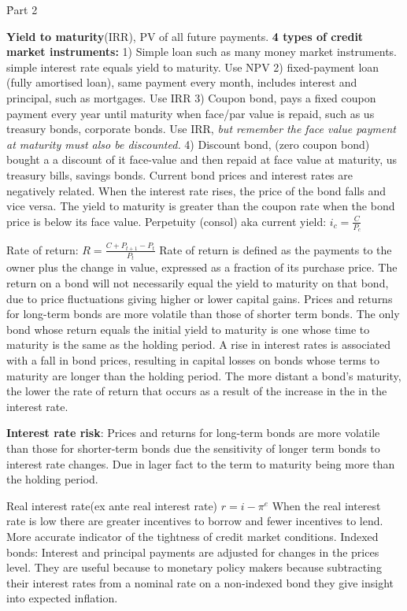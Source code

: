 \documentclass[12pt]{examnotes}
\begin{document}
\h{Part 2}


\textbf{Yield to maturity}(IRR), PV of all future payments. 
\textbf{4 types of credit market instruments:} 
1) Simple loan such as many money market instruments. simple interest rate equals yield to maturity. Use NPV  
2) fixed-payment loan (fully amortised loan), same payment every month, includes interest and principal, such as mortgages. Use IRR 
3) Coupon bond, pays a fixed coupon payment every year until maturity when face/par value is repaid, such as us treasury bonds, corporate bonds. Use IRR, \emph{but remember the face value payment at maturity must also be discounted.}
4) Discount bond, (zero coupon bond) bought a a discount of it face-value and then repaid at face value at maturity, us treasury bills, savings bonds. 
Current bond prices and interest rates are negatively related. When the interest rate rises, the price of the bond falls and vice versa. The yield to  maturity is greater than the coupon rate when the bond price is below its face value. 
Perpetuity (consol) aka current yield: $i_c=\displaystyle\frac{C}{P_c}$ 

Rate of return: $R=\displaystyle \frac{C+P_{t+1}-P_t}{P_t}$
Rate of return is defined as the payments to the owner plus the change in value, expressed as a fraction of its purchase price.
The return on a bond will not necessarily equal the yield to maturity on that bond, due to price fluctuations giving higher or lower capital gains. Prices and returns for long-term bonds are more volatile than those of shorter term bonds. 
The only bond whose return equals the initial yield to maturity is one whose time to maturity is the same as the holding period.
A rise in interest rates is associated with a fall in bond prices, resulting in capital losses on bonds whose terms to maturity are longer than the holding period.
The more distant a bond's maturity, the lower the rate of return that occurs as a result of the increase in the in the interest rate. 

\textbf{Interest rate risk}: Prices and returns for long-term bonds are more volatile than those for shorter-term bonds due the sensitivity of longer term bonds to interest rate changes. Due in lager fact to the term to maturity being more than the holding period.

Real interest rate(ex ante real interest rate) $r=i-\pi^e$ 
When the real interest rate is low there are greater incentives to borrow and fewer incentives to lend. 
More accurate indicator of the tightness of credit market conditions. 
Indexed bonds: Interest and principal payments are adjusted for changes in the prices level. They are useful because to monetary policy makers because subtracting their interest rates from a nominal rate on a non-indexed bond they give insight into expected inflation.
\end{document}
